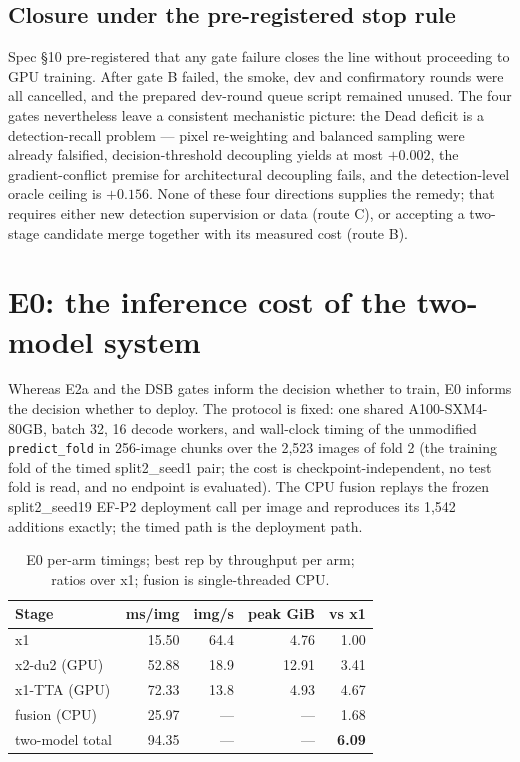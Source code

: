 \documentclass[11pt,a4paper]{article}
\newcommand{\code}[1]{\nolinkurl{#1}}
\begin{document}
\subsection{Closure under the pre-registered stop rule}

Spec \S10 pre-registered that any gate failure closes the line without proceeding to GPU training. After gate B failed, the smoke, dev and confirmatory rounds were all cancelled, and the prepared dev-round queue script remained unused. The four gates nevertheless leave a consistent mechanistic picture: the Dead deficit is a detection-recall problem --- pixel re-weighting and balanced sampling were already falsified, decision-threshold decoupling yields at most $+0.002$, the gradient-conflict premise for architectural decoupling fails, and the detection-level oracle ceiling is $+0.156$. None of these four directions supplies the remedy; that requires either new detection supervision or data (route C), or accepting a two-stage candidate merge together with its measured cost (route B).

\section{E0: the inference cost of the two-model system}

Whereas E2a and the DSB gates inform the decision whether to train, E0 informs the decision whether to deploy. The protocol is fixed: one shared A100-SXM4-80GB, batch 32, 16 decode workers, and wall-clock timing of the unmodified \code{predict\_fold} in 256-image chunks over the 2,523 images of fold 2 (the training fold of the timed split2\_seed1 pair; the cost is checkpoint-independent, no test fold is read, and no endpoint is evaluated). The CPU fusion replays the frozen split2\_seed19 EF-P2 deployment call per image and reproduces its 1,542 additions exactly; the timed path is the deployment path.

\begin{table}[H]
\centering\small
\caption{E0 per-arm timings; best rep by throughput per arm; ratios over x1; fusion is single-threaded CPU.}
\label{tab:e0}
\begin{tabular}{lrrrr}\toprule
Stage & ms/img & img/s & peak GiB & vs x1\\\midrule
x1 & 15.50 & 64.4 & 4.76 & 1.00\\
x2-du2 (GPU) & 52.88 & 18.9 & 12.91 & 3.41\\
x1-TTA (GPU) & 72.33 & 13.8 & 4.93 & 4.67\\
fusion (CPU) & 25.97 & --- & --- & 1.68\\
two-model total & 94.35 & --- & --- & \textbf{6.09}\\\bottomrule
\end{tabular}
\end{table}
\end{document}

